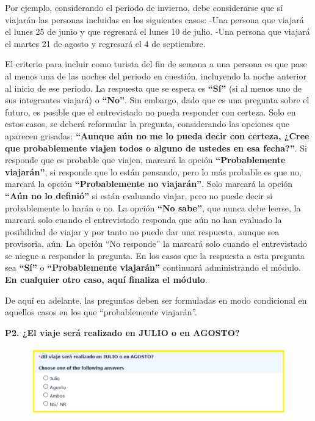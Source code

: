 \documentclass[
  openany]{book}
\begin{document}
Por ejemplo, considerando el periodo de invierno, debe considerarse que sí viajarán las personas incluidas en los siguientes casos: -Una persona que viajará el lunes 25 de junio y que regresará el lunes 10 de julio. -Una persona que viajará el martes 21 de agosto y regresará el 4 de septiembre.

El criterio para incluir como turista del fin de semana a una persona es que pase al menos una de las noches del periodo en cuestión, incluyendo la noche anterior al inicio de ese periodo. La respuesta que se espera es \textbf{``Sí''} (si al menos uno de sus integrantes viajará) o \textbf{``No''}. Sin embargo, dado que es una pregunta sobre el futuro, es posible que el entrevistado no pueda responder con certeza. Solo en estos casos, se deberá reformular la pregunta, considerando las opciones que aparecen grisadas: \textbf{``Aunque aún no me lo pueda decir con certeza, ¿Cree que probablemente viajen todos o alguno de ustedes en esa fecha?''}. Si responde que es probable que viajen, marcará la opción \textbf{``Probablemente viajarán''}, si responde que lo están pensando, pero lo más probable es que no, marcará la opción \textbf{``Probablemente no viajarán''}. Solo marcará la opción \textbf{``Aún no lo definió''} si están evaluando viajar, pero no puede decir si probablemente lo harán o no. La opción \textbf{``No sabe''}, que nunca debe leerse, la marcará solo cuando el entrevistado responda que aún no han evaluado la posibilidad de viajar y por tanto no puede dar una respuesta, aunque sea provisoria, aún. La opción ``No responde'' la marcará solo cuando el entrevistado se niegue a responder la pregunta. En los casos que la respuesta a esta pregunta sea \textbf{``Sí''} o \textbf{``Probablemente viajarán''} continuará administrando el módulo. \textbf{En cualquier otro caso, aquí finaliza el módulo}.

De aquí en adelante, las preguntas deben ser formuladas en modo condicional en aquellos casos en los que ``probablemente viajarán''.

\textbf{P2. ¿El viaje será realizado en JULIO o en AGOSTO?}

\begin{figure}

{\centering \includegraphics[width=1\linewidth]{imagenes/figura6-129} 

}

\end{figure}
\end{document}
